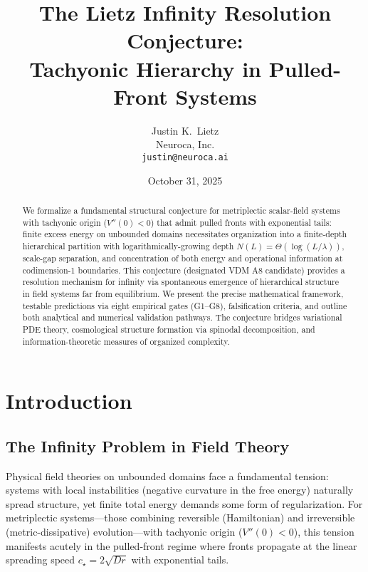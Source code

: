 \documentclass{article}
\title{The Lietz Infinity Resolution Conjecture:\\Tachyonic Hierarchy in Pulled-Front Systems}
\author{Justin K.\ Lietz\\
Neuroca, Inc.\\
\texttt{justin@neuroca.ai}}
\date{October 31, 2025}
\begin{document}
\maketitle

\begin{abstract}
We formalize a fundamental structural conjecture for metriplectic scalar-field systems with tachyonic origin ($V''(0)<0$) that admit pulled fronts with exponential tails: finite excess energy on unbounded domains necessitates organization into a finite-depth hierarchical partition with logarithmically-growing depth $N(L)=\Theta(\log(L/\lambda))$, scale-gap separation, and concentration of both energy and operational information at codimension-1 boundaries. This conjecture (designated VDM A8 candidate) provides a resolution mechanism for infinity via spontaneous emergence of hierarchical structure in field systems far from equilibrium. We present the precise mathematical framework, testable predictions via eight empirical gates (G1--G8), falsification criteria, and outline both analytical and numerical validation pathways. The conjecture bridges variational PDE theory, cosmological structure formation via spinodal decomposition, and information-theoretic measures of organized complexity.
\end{abstract}


\section{Introduction}

\subsection{The Infinity Problem in Field Theory}

Physical field theories on unbounded domains face a fundamental tension: systems with local instabilities (negative curvature in the free energy) naturally spread structure, yet finite total energy demands some form of regularization. For metriplectic systems—those combining reversible (Hamiltonian) and irreversible (metric-dissipative) evolution—with tachyonic origin ($V''(0)<0$), this tension manifests acutely in the pulled-front regime where fronts propagate at the linear spreading speed $c_\star = 2\sqrt{Dr}$ with exponential tails.
\end{document}

